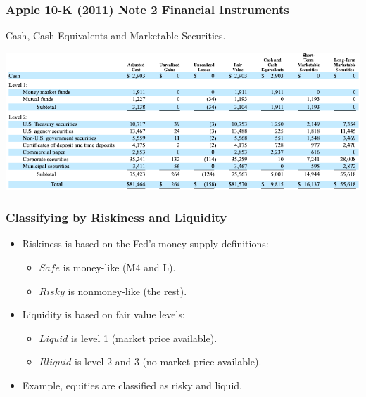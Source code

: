 \documentclass[handout]{beamer}
\begin{document}
\begin{frame}
\frametitle{Apple 10-K (2011) Note 2 Financial Instruments}
 Cash, Cash Equivalents and Marketable Securities.

\centering
\includegraphics[scale=0.4]{AAPL_2011_note2}

\hyperlink{duchinapproach}{}
\end{frame}







\begin{frame}[label=classify]
\frametitle{Classifying by Riskiness and Liquidity}
\begin{itemize}
\item Riskiness is based on the Fed's money supply definitions:
\begin{itemize}
\item $Safe$ is money-like (M4 and L). 
\item $Risky$ is nonmoney-like (the rest).
\end{itemize}
\item Liquidity is based on fair value levels:
\begin{itemize}
\item $Liquid$ is level 1 (market price available).
\item $Illiquid$ is level 2 and 3 (no market price available).
\end{itemize}
\bigskip
\item Example, equities are classified as risky and liquid.
\end{itemize}
\end{frame}
\end{document}
